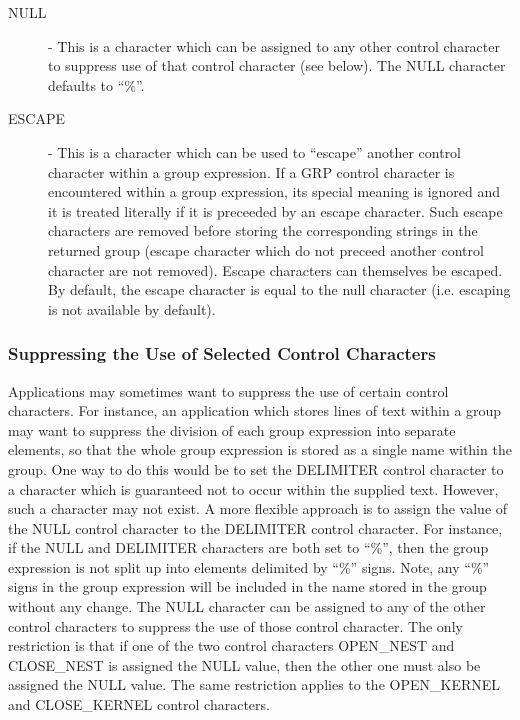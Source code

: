 \begin{description}
\item [NULL] - This is a character which can be assigned to any other control
character to suppress use of that control character (see below). The NULL
character defaults to ``\%''.

\item [ESCAPE] - This is a character which can be used to ``escape'' another
control character within a group expression. If a GRP control character is 
encountered within a group expression, its special meaning is ignored
and it is treated literally if it is preceeded by an escape character.
Such escape characters are removed before storing the corresponding
strings in the returned group (escape character which do not preceed
another control character are not removed). Escape characters can 
themselves be escaped. By default, the escape character is equal to the
null character (i.e. escaping is not available by default).

\end{description}

\subsubsection {Suppressing the Use of Selected Control Characters}
Applications may sometimes want to suppress the use of certain control
characters. For instance, an application which stores lines of text within a
group may want to suppress the division of each group expression into separate
elements, so that the whole group expression is stored as a single name within
the group. One way to do this would be to set the DELIMITER control character to
a character which is guaranteed not to occur within the supplied text. However,
such a character may not exist. A more flexible approach is to assign the value
of the NULL control character to the DELIMITER control character. For instance,
if the NULL and DELIMITER characters are both set to ``\%'', then the group
expression is not split up into elements delimited by ``\%'' signs. Note, any
``\%'' signs in the group expression will be included in the name stored in the
group without any change. The NULL character can be assigned to any of the other
control characters to suppress the use of those control character. The only
restriction is that if one of the two control characters OPEN\_NEST and
CLOSE\_NEST is assigned the NULL value, then the other one must also be assigned
the NULL value. The same restriction applies to the OPEN\_KERNEL and
CLOSE\_KERNEL control characters.

